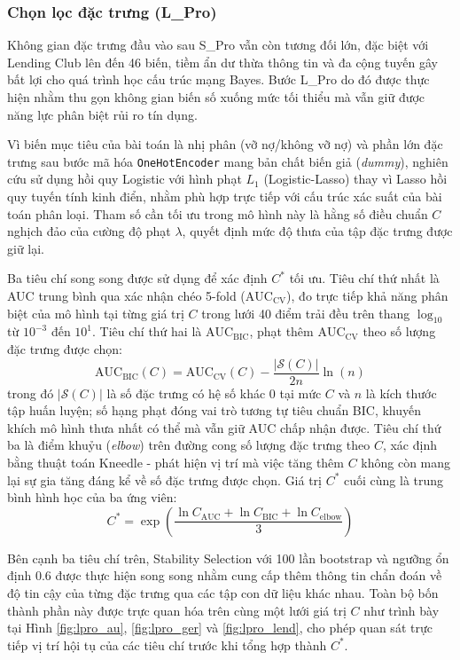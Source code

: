 \subsubsection{Chọn lọc đặc trưng (L\_Pro)}
\noindent
Không gian đặc trưng đầu vào sau S\_Pro vẫn còn tương đối lớn, đặc biệt với Lending Club lên đến 46 biến, tiềm ẩn dư thừa thông tin và đa cộng tuyến gây bất lợi cho quá trình học cấu trúc mạng Bayes. Bước L\_Pro do đó được thực hiện nhằm thu gọn không gian biến số xuống mức tối thiểu mà vẫn giữ được năng lực phân biệt rủi ro tín dụng.

Vì biến mục tiêu của bài toán là nhị phân (vỡ nợ/không vỡ nợ) và phần lớn đặc trưng sau bước mã hóa \texttt{OneHotEncoder} mang bản chất biến giả (\textit{dummy}), nghiên cứu sử dụng hồi quy Logistic với hình phạt $L_1$ (Logistic-Lasso) thay vì Lasso hồi quy tuyến tính kinh điển, nhằm phù hợp trực tiếp với cấu trúc xác suất của bài toán phân loại. Tham số cần tối ưu trong mô hình này là hằng số điều chuẩn $C$ nghịch đảo của cường độ phạt $\lambda$, quyết định mức độ thưa của tập đặc trưng được giữ lại.

Ba tiêu chí song song được sử dụng để xác định $C^*$ tối ưu. Tiêu chí thứ nhất là AUC trung bình qua xác nhận chéo 5-fold ($\text{AUC}_{\text{CV}}$), đo trực tiếp khả năng phân biệt của mô hình tại từng giá trị $C$ trong lưới 40 điểm trải đều trên thang $\log_{10}$ từ $10^{-3}$ đến $10^1$. Tiêu chí thứ hai là $\text{AUC}_{\text{BIC}}$, phạt thêm $\text{AUC}_{\text{CV}}$ theo số lượng đặc trưng được chọn:
\begin{equation}
    \text{AUC}_{\text{BIC}}(C) = \text{AUC}_{\text{CV}}(C) - \frac{|\mathcal{S}(C)|}{2n}\ln(n)
    \label{eq:auc_bic_new}
\end{equation}
trong đó $|\mathcal{S}(C)|$ là số đặc trưng có hệ số khác $0$ tại mức $C$ và $n$ là kích thước tập huấn luyện; số hạng phạt đóng vai trò tương tự tiêu chuẩn BIC, khuyến khích mô hình thưa nhất có thể mà vẫn giữ AUC chấp nhận được. Tiêu chí thứ ba là điểm khuỷu (\textit{elbow}) trên đường cong số lượng đặc trưng theo $C$, xác định bằng thuật toán Kneedle - phát hiện vị trí mà việc tăng thêm $C$ không còn mang lại sự gia tăng đáng kể về số đặc trưng được chọn. Giá trị $C^*$ cuối cùng là trung bình hình học của ba ứng viên:
\begin{equation}
    C^* = \exp\left(\frac{\ln C_{\text{AUC}} + \ln C_{\text{BIC}} + \ln C_{\text{elbow}}}{3}\right)
    \label{eq:c_star_new}
\end{equation}

Bên cạnh ba tiêu chí trên, Stability Selection với 100 lần bootstrap và ngưỡng ổn định $0.6$ \citep{meinshausen2010} được thực hiện song song nhằm cung cấp thêm thông tin chẩn đoán về độ tin cậy của từng đặc trưng qua các tập con dữ liệu khác nhau. Toàn bộ bốn thành phần này được trực quan hóa trên cùng một lưới giá trị $C$ như trình bày tại Hình \ref{fig:lpro_au}, \ref{fig:lpro_ger} và \ref{fig:lpro_lend}, cho phép quan sát trực tiếp vị trí hội tụ của các tiêu chí trước khi tổng hợp thành $C^*$.

